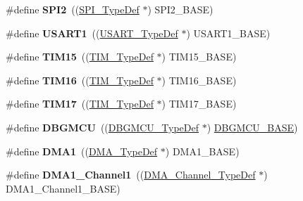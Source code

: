 \begin{DoxyCompactItemize}
\#define {\bfseries S\+P\+I2}~((\hyperlink{struct_s_p_i___type_def}{S\+P\+I\+\_\+\+Type\+Def} $\ast$) S\+P\+I2\+\_\+\+B\+A\+SE)
\item 
\mbox{\label{group___peripheral__declaration_ga92871691058ff7ccffd7635930cb08da}} 
\#define {\bfseries U\+S\+A\+R\+T1}~((\hyperlink{struct_u_s_a_r_t___type_def}{U\+S\+A\+R\+T\+\_\+\+Type\+Def} $\ast$) U\+S\+A\+R\+T1\+\_\+\+B\+A\+SE)
\item 
\mbox{\label{group___peripheral__declaration_ga87e4b442041d1c03a6af113fbe04a182}} 
\#define {\bfseries T\+I\+M15}~((\hyperlink{struct_t_i_m___type_def}{T\+I\+M\+\_\+\+Type\+Def} $\ast$) T\+I\+M15\+\_\+\+B\+A\+SE)
\item 
\mbox{\label{group___peripheral__declaration_ga73ec606e7dacf17e18c661e8ff8c7c8d}} 
\#define {\bfseries T\+I\+M16}~((\hyperlink{struct_t_i_m___type_def}{T\+I\+M\+\_\+\+Type\+Def} $\ast$) T\+I\+M16\+\_\+\+B\+A\+SE)
\item 
\mbox{\label{group___peripheral__declaration_ga65aea6c8b36439e44ad6cde0e6891aab}} 
\#define {\bfseries T\+I\+M17}~((\hyperlink{struct_t_i_m___type_def}{T\+I\+M\+\_\+\+Type\+Def} $\ast$) T\+I\+M17\+\_\+\+B\+A\+SE)
\item 
\mbox{\label{group___peripheral__declaration_ga92ec6d9ec2251fda7d4ce09748cd74b4}} 
\#define {\bfseries D\+B\+G\+M\+CU}~((\hyperlink{struct_d_b_g_m_c_u___type_def}{D\+B\+G\+M\+C\+U\+\_\+\+Type\+Def} $\ast$) \hyperlink{group___peripheral__memory__map_ga4adaf4fd82ccc3a538f1f27a70cdbbef}{D\+B\+G\+M\+C\+U\+\_\+\+B\+A\+SE})
\item 
\mbox{\label{group___peripheral__declaration_gacc16d2a5937f7585320a98f7f6b578f9}} 
\#define {\bfseries D\+M\+A1}~((\hyperlink{struct_d_m_a___type_def}{D\+M\+A\+\_\+\+Type\+Def} $\ast$) D\+M\+A1\+\_\+\+B\+A\+SE)
\item 
\mbox{\label{group___peripheral__declaration_gac83c5be824be1c02716e2522e80ddf7a}} 
\#define {\bfseries D\+M\+A1\+\_\+\+Channel1}~((\hyperlink{struct_d_m_a___channel___type_def}{D\+M\+A\+\_\+\+Channel\+\_\+\+Type\+Def} $\ast$) D\+M\+A1\+\_\+\+Channel1\+\_\+\+B\+A\+SE)

\end{DoxyCompactItemize}
